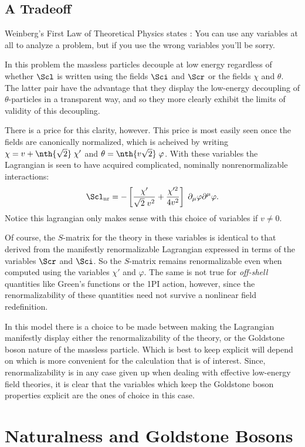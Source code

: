 \documentclass[12pt]{article}
\def\eq{\begin{equation}}
\def\eeq{\end{equation}}
\begin{document}
\subsection{A Tradeoff}

Weinberg's First Law of Theoretical Physics states 
\cite{WeinbergGL}: You can use any variables at all to 
analyze a problem, but if you use the wrong variables you'll
be sorry.

In this problem the massless particles decouple at low energy
regardless of whether $\Scl$ is written using the fields $\Sci$
and $\Scr$ or the fields $\chi$ and $\theta$. The latter pair
have the advantage that they display the low-energy decoupling
of $\theta$-particles in a transparent way, and so they more
clearly exhibit the limits of validity of this decoupling.

There is a price for this clarity, however. This price is most 
easily seen once the fields are canonically normalized, 
which is acheived by writing $\chi = v +
\nth{\sqrt{2}} \; \chi'$ and $\theta = \nth{v \sqrt{2}} \; \varphi$. With
these variables the Lagrangian is seen to have acquired complicated,
nominally nonrenormalizable interactions:
%
\eq
\label{nrints}
\Scl_{\rm nr} = - \left[ {\chi' \over \sqrt{2} \; v^2} + {\chi'^2 \over 4 v^2}
\right] \; \partial_\mu \varphi \partial^\mu \varphi. 
\eeq
%
Notice this lagrangian only makes sense with this choice of variables
if $v \ne 0$.

Of course, the $S$-matrix for the theory in these variables is identical to
that derived from the manifestly renormalizable Lagrangian expressed in terms
of the variables $\Scr$ and $\Sci$. So the $S$-matrix remains renormalizable
even when computed using the variables $\chi'$ and $\varphi$. The same is not
true for {\em off-shell} quantities like Green's functions or the 1PI action,
however, since the renormalizability of these quantities need not survive a
nonlinear field redefinition. 

In this model there is a choice to be made between making the
Lagrangian manifestly display either the renormalizability of the theory, or
the Goldstone boson nature of the massless particle. Which is best to keep
explicit will depend on which is more convenient for the calculation that is
of interest. Since, renormalizability is in any case given up
when dealing with effective low-energy field theories, it is clear that the
variables which keep the Goldstone boson properties explicit are the ones of
choice in this case. 

\section{Naturalness and Goldstone Bosons}
\end{document}
